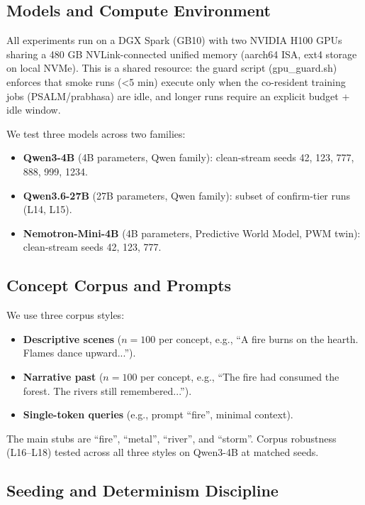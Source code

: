 \label{sec:setup}

\subsection*{Models and Compute Environment}

All experiments run on a DGX Spark (GB10) with two NVIDIA H100 GPUs sharing a 480 GB NVLink-connected
unified memory (aarch64 ISA, ext4 storage on local NVMe).
This is a shared resource: the guard script (gpu\_guard.sh) enforces that smoke runs (<5 min) execute
only when the co-resident training jobs (PSALM/prabhasa) are idle, and longer runs require an explicit budget + idle window.

We test three models across two families:
\begin{itemize}
\item {\bf Qwen3-4B} (4B parameters, Qwen family): clean-stream seeds 42, 123, 777, 888, 999, 1234.
\item {\bf Qwen3.6-27B} (27B parameters, Qwen family): subset of confirm-tier runs (L14, L15).
\item {\bf Nemotron-Mini-4B} (4B parameters, Predictive World Model, PWM twin): clean-stream seeds 42, 123, 777.
\end{itemize}

\subsection*{Concept Corpus and Prompts}

We use three corpus styles:
\begin{itemize}
\item {\bf Descriptive scenes} ($n=100$ per concept, e.g., ``A fire burns on the hearth. Flames dance upward...'').
\item {\bf Narrative past} ($n=100$ per concept, e.g., ``The fire had consumed the forest. The rivers still remembered...'').
\item {\bf Single-token queries} (e.g., prompt ``fire'', minimal context).
\end{itemize}

The main stubs are ``fire'', ``metal'', ``river'', and ``storm''.
Corpus robustness (L16--L18) tested across all three styles on Qwen3-4B at matched seeds.

\subsection*{Seeding and Determinism Discipline}

